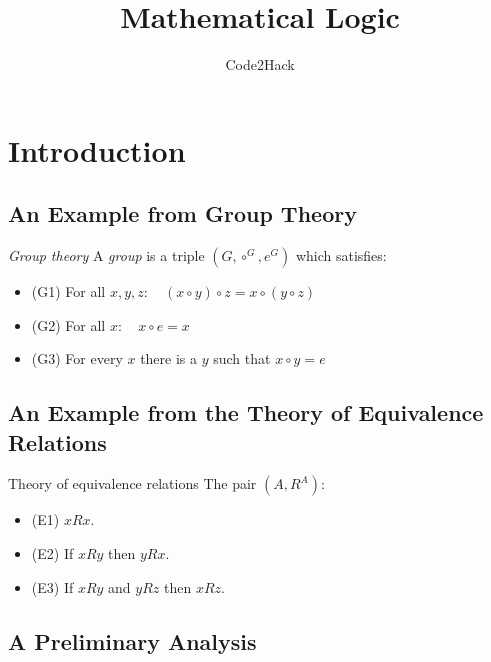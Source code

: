 \documentclass{article}
\title{Mathematical Logic}
\author{Code2Hack}
\begin{document}
\maketitle
\tableofcontents
\newpage

\section{Introduction}
\subsection{An Example from Group Theory}

\begin{axiom}{\it Group theory}
    A {\it group} is a triple $(G, \circ^G, e^G)$ which satisfies:
    \begin{itemize}
        \item (G1) For all $x,y,z: \quad (x \circ y) \circ z = x \circ (y \circ z)$
        \item (G2) For all $x: \quad x \circ e = x$
        \item (G3) For every $x$ there is a $y$ such that $x \circ y = e$
    \end{itemize}
\end{axiom}

\subsection{An Example from the Theory of Equivalence Relations}

\begin{axiom}{Theory of equivalence relations}
    The pair $(A, R^A)$:
    \begin{itemize}
        \item (E1) $xRx$.
        \item (E2) If $xRy$ then $yRx$.
        \item (E3) If $xRy$ and $yRz$ then $xRz$.
    \end{itemize}
\end{axiom}

\subsection{A Preliminary Analysis}
\end{document}
